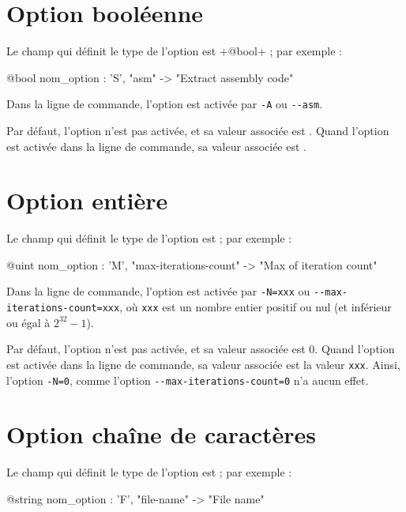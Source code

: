 \section{Option booléenne}

Le champ qui définit le type de l'option est \ggs+@bool+ ; par exemple :
\begin{galgascode}
  @bool nom_option : 'S', "asm" -> "Extract assembly code"
\end{galgascode}

Dans la ligne de commande, l'option est activée par \texttt{-A} ou \texttt{-{}-asm}.

Par défaut, l'option n'est pas activée, et sa valeur associée est . Quand l'option est activée dans la ligne de commande, sa valeur associée est .








\section{Option entière}

Le champ qui définit le type de l'option est  ; par exemple :
\begin{galgascode}
  @uint nom_option : 'M', "max-iterations-count" -> "Max of iteration count"
\end{galgascode}

Dans la ligne de commande, l'option est activée par \texttt{-N=xxx} ou \texttt{-{}-max-iterations-count=xxx}, où \texttt{xxx} est un nombre entier positif ou nul (et inférieur ou égal à $2^{32}-1$).

Par défaut, l'option n'est pas activée, et sa valeur associée est $0$. Quand l'option est activée dans la ligne de commande, sa valeur associée est la valeur \texttt{xxx}. Ainsi, l'option \texttt{-N=0}, comme l'option \texttt{-{}-max-iterations-count=0} n'a aucun effet.










\section{Option chaîne de caractères}

Le champ qui définit le type de l'option est  ; par exemple :
\begin{galgascode}
  @string nom_option : 'F', "file-name" -> "File name"
\end{galgascode}

